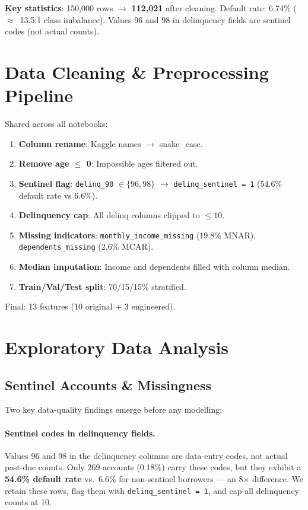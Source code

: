 \documentclass[11pt,a4paper]{article}
\begin{document}
\textbf{Key statistics}: 150,000 rows $\rightarrow$ \textbf{112,021} after cleaning. Default rate: 6.74\% ($\approx$~13.5:1 class imbalance). Values 96 and 98 in delinquency fields are sentinel codes (not actual counts).


\section{Data Cleaning \& Preprocessing Pipeline}

Shared across all notebooks:
\begin{enumerate}
    \item \textbf{Column rename}: Kaggle names $\to$ snake\_case.
    \item \textbf{Remove age $\leq$ 0}: Impossible ages filtered out.
    \item \textbf{Sentinel flag}: \texttt{delinq\_90} $\in \{96, 98\}$ $\to$ \texttt{delinq\_sentinel = 1} (54.6\% default rate vs 6.6\%).
    \item \textbf{Delinquency cap}: All delinq columns clipped to $\leq 10$.
    \item \textbf{Missing indicators}: \texttt{monthly\_income\_missing} (19.8\% MNAR), \texttt{dependents\_missing} (2.6\% MCAR).
    \item \textbf{Median imputation}: Income and dependents filled with column median.
    \item \textbf{Train/Val/Test split}: 70/15/15\% stratified.
\end{enumerate}
Final: 13 features (10 original + 3 engineered).


\section{Exploratory Data Analysis}

\subsection{Sentinel Accounts \& Missingness}

Two key data-quality findings emerge before any modelling:

\paragraph{Sentinel codes in delinquency fields.}
Values 96 and 98 in the delinquency columns are data-entry codes, not actual past-due counts.
Only 269 accounts (0.18\%) carry these codes, but they exhibit a \textbf{54.6\% default rate} vs.\ 6.6\% for non-sentinel borrowers --- an 8$\times$ difference.
We retain these rows, flag them with \texttt{delinq\_sentinel = 1}, and cap all delinquency counts at 10.
\end{document}
